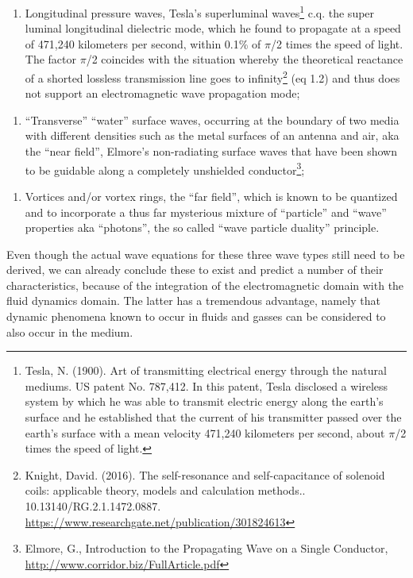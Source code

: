\documentclass[a4paper]{article}
\newcommand\textstyleNone[1]{#1}
\begin{document}
\begin{enumerate}
\item {
\textstyleNone{{Longitudinal pressure waves, Tesla's superluminal
waves}}\footnote{\textstyleNone{ Tesla, N. (1900). Art of transmitting electrical energy through the natural mediums.
US patent No. 787,412. In this patent, Tesla disclosed a wireless system by which he was able to transmit electric
energy along the earth's surface and he established that the current of his transmitter passed over the earth's surface
with a mean velocity 471,240 kilometers per second, about $\pi $/2 times the speed of light.}\par
}\textstyleNone{{ c.q. the super luminal longitudinal dielectric
mode, which he found to propagate at a speed of }471,240 kilometers
{per second, within 0.1\% of $\pi $/2 times the speed of light. The
factor $\pi $/2 coincides with the situation whereby the theoretical reactance of a shorted lossless transmission line
goes to infinity}}\footnote{ Knight, David. (2016). The self-resonance and self-capacitance of solenoid coils:
applicable theory, models and calculation methods.. 10.13140/RG.2.1.1472.0887. 
\url{https://www.researchgate.net/publication/301824613} \par
}\textstyleNone{{ (eq 1.2) and thus does not support an
electromagnetic wave propagation mode; }}}
\end{enumerate}
\begin{enumerate}
\item {
\textstyleNone{{{}``Transverse'' ``water'' surface waves, occurring
at the boundary of two media with different densities such as the metal surfaces of an antenna and air, aka the ``near
field'', }{Elmore's
}{non-radiating surface waves that
}{have }{been
shown to be guidable along a
completel}{y}{
unshielded conductor}}\footnote{ Elmore, G., Introduction to the Propagating Wave on a Single Conductor,
\url{http://www.corridor.biz/FullArticle.pdf}\par
}\textstyleNone{{;}}}
\end{enumerate}
\begin{enumerate}
\item {
\textstyleNone{{Vortices and/or vortex rings, the ``far field'',
which is known to be quantized and to incorporate a thus far mysterious mixture of ``particle'' and ``wave'' properties
}{aka
``photons''}{, the so called ``wave particle duality'' principle.
}}}
\end{enumerate}
{
\textstyleNone{{Even though the actual wave equations for these
three wave types still need to be derived, we can already conclude these to exist and predict a number of their
characteristics, because of the integration of the electromagnetic domain with the fluid dynamics domain. The latter
has a tremendous advantage, namely that dynamic phenomena known to occur in fluids and gasses can be considered to also
occur in the medium.}}}
\end{document}
